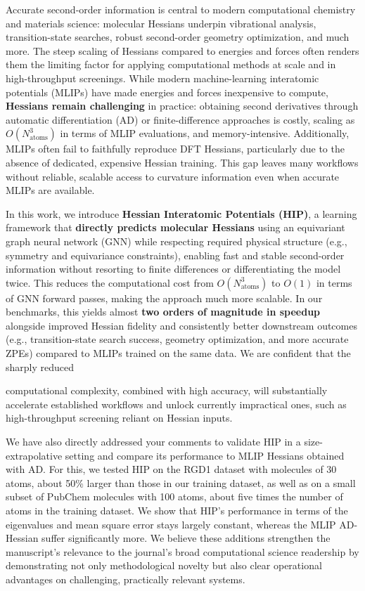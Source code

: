 \documentclass[11pt,letterpaper]{article}
\begin{document}
Accurate second-order information is central to modern computational chemistry and materials science: molecular Hessians underpin vibrational analysis, transition-state searches, robust second-order geometry optimization, and much more. The steep scaling of Hessians compared to energies and forces often renders them the limiting factor for applying computational methods at scale and in high-throughput screenings. While modern machine-learning interatomic potentials (MLIPs) have made energies and forces inexpensive to compute, \textbf{Hessians remain challenging} in practice: obtaining second derivatives through automatic differentiation (AD) or finite-difference approaches is costly, scaling as $O(N_{\mathrm{atoms}}^{3})$ in terms of MLIP evaluations, and memory-intensive. Additionally, MLIPs often fail to faithfully reproduce DFT Hessians, particularly due to the absence of dedicated, expensive Hessian training. This gap leaves many workflows without reliable, scalable access to curvature information even when accurate MLIPs are available.

In this work, we introduce \textbf{Hessian Interatomic Potentials (HIP)}, a learning framework that \textbf{directly predicts molecular Hessians} using an equivariant graph neural network (GNN) while respecting required physical structure (e.g., symmetry and equivariance constraints), enabling fast and stable second-order information without resorting to finite differences or differentiating the model twice. This reduces the computational cost from $O(N_{\mathrm{atoms}}^{3})$ to $O(1)$ in terms of GNN forward passes, making the approach much more scalable. In our benchmarks, this yields almost \textbf{two orders of magnitude in speedup} alongside improved Hessian fidelity and consistently better downstream outcomes (e.g., transition-state search success, geometry optimization, and more accurate ZPEs) compared to MLIPs trained on the same data. We are confident that the sharply reduced

\newpage
\enlargethispage{28pt}

\noindent computational complexity, combined with high accuracy, will substantially accelerate established workflows and unlock currently impractical ones, such as high-throughput screening reliant on Hessian inputs.

{
We have also directly addressed your comments to validate HIP in a size-extrapolative setting and compare its performance to MLIP Hessians obtained with AD. For this, we tested HIP on the RGD1 dataset with molecules of 30 atoms, about 50\% larger than those in our training dataset, as well as on a small subset of PubChem molecules with 100 atoms, about five times the number of atoms in the training dataset. We show that HIP's performance in terms of the eigenvalues and mean square error stays largely constant, whereas the MLIP AD-Hessian suffer significantly more. We believe these additions strengthen the manuscript's relevance to the journal's broad computational science readership by demonstrating not only methodological novelty but also clear operational advantages on challenging, practically relevant systems.
}
\end{document}
